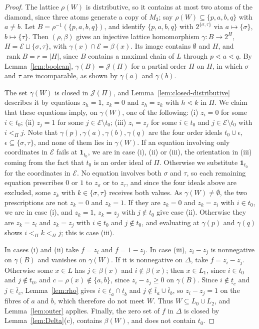 \documentclass{amsart}
\theoremstyle{definition}
\DeclareMathOperator{\rk}{rank}
\newcommand{\cE}{\mathcal E}
\newcommand{\one}{\mathbf 1}
\newcommand{\lt}{\underline{t}}
\newcommand{\ut}{\overline{t}}
\begin{document}
\begin{proof}
The lattice $\rho(W)$ is distributive, so it contains at most two atoms of the diamond, since three atoms generate a copy of $M_3$; say $\rho(W)\subseteq\{p,a,b,q\}$ with $a\ne b$. Let $B=\rho^{-1}(\{p,a,b,q\})$, and identify $\{p,a,b,q\}$ with $2^{\{\sigma,\tau\}}$ via $a\mapsto\{\sigma\}$, $b\mapsto\{\tau\}$. Then $(\rho,\beta)$ gives an injective lattice homomorphism $\gamma:B\to2^H$, $H=\cE\sqcup\{\sigma,\tau\}$, with $\gamma(x)\cap\cE=\beta(x)$. Its image contains $\emptyset$ and $H$, and $\rk B=r=|H|$, since $B$ contains a maximal chain of $L$ through $p\lessdot a\lessdot q$. By Lemma~\ref{lem:boolean}, $\gamma(B)=\mathcal J(\Pi)$ for a partial order $\Pi$ on $H$, in which $\sigma$ and $\tau$ are incomparable, as shown by $\gamma(a)$ and $\gamma(b)$.

The set $\gamma(W)$ is closed in $\mathcal J(\Pi)$, and Lemma~\ref{lem:closed-distributive} describes it by equations $z_h=1$, $z_k=0$ and $z_h=z_k$ with $h\lessdot k$ in $\Pi$. We claim that these equations imply, on $\gamma(W)$, one of the following: (i) $z_i=0$ for some $i\in t_0$; (ii) $z_j=1$ for some $j\in\cE\setminus t_0$; (iii) $z_i=z_j$ for some $i\in t_0$ and $j\in\cE\setminus t_0$ with $i<_\Pi j$. Note that $\gamma(p),\gamma(a),\gamma(b),\gamma(q)$ are the four order ideals $t_0\cup\epsilon$, $\epsilon\subseteq\{\sigma,\tau\}$, and none of them lies in $\gamma(W)$. If an equation involving only coordinates in $\cE$ fails at $\one_{t_0}$, we are in case (i), (ii) or (iii), the orientation in (iii) coming from the fact that $t_0$ is an order ideal of $\Pi$. Otherwise we substitute $\one_{t_0}$ for the coordinates in $\cE$. No equation involves both $\sigma$ and $\tau$, so each remaining equation prescribes $0$ or $1$ to $z_\sigma$ or to $z_\tau$, and since the four ideals above are excluded, some $z_k$ with $k\in\{\sigma,\tau\}$ receives both values. As $\gamma(W)\ne\emptyset$, the two prescriptions are not $z_k=0$ and $z_k=1$. If they are $z_k=0$ and $z_k=z_i$ with $i\in t_0$, we are in case (i), and $z_k=1$, $z_k=z_j$ with $j\notin t_0$ give case (ii). Otherwise they are $z_k=z_i$ and $z_k=z_j$ with $i\in t_0$ and $j\notin t_0$, and evaluating at $\gamma(p)$ and $\gamma(q)$ shows $i<_\Pi k<_\Pi j$; this is case (iii).

In cases (i) and (ii) take $f=z_i$ and $f=1-z_j$. In case (iii), $z_i-z_j$ is nonnegative on $\gamma(B)$ and vanishes on $\gamma(W)$. If it is nonnegative on $\Delta$, take $f=z_i-z_j$. Otherwise some $x\in L$ has $j\in\beta(x)$ and $i\notin\beta(x)$; then $x\in L_1$, since $i\in t_0$ and $j\notin t_0$, and $c=\rho(x)\notin\{a,b\}$, since $z_i-z_j\ge0$ on $\gamma(B)$. Since $i\notin\lt_c$ and $j\in\ut_c$, Lemma~\ref{lem:rho} gives $i\in\lt_a\cap\lt_b$ and $j\notin\ut_a\cup\ut_b$, so $z_i-z_j=1$ on the fibres of $a$ and $b$, which therefore do not meet $W$. Thus $W\subseteq L_0\cup L_2$, and Lemma~\ref{lem:outer} applies. Finally, the zero set of $f$ in $\Delta$ is closed by Lemma~\ref{lem:Delta}(c), contains $\beta(W)$, and does not contain $t_0$.
\end{proof}
\end{document}
